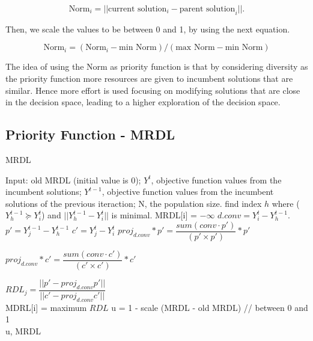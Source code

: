 \begin{equation}
 \text{Norm}_i = ||\text{current solution}_i - \text{parent solution}_i||.
\end{equation}

Then, we scale the values to be between 0 and 1, by using the next equation.

\begin{equation}\label{scaling}
 \text{Norm}_i = (\text{Norm}_i - \text{min  Norm}) / (\text{max Norm} - \text{min Norm})
\end{equation}

The idea of using the Norm as priority function is that by considering diversity as the priority function more resources are given to incumbent solutions that are similar. Hence more effort is used focusing on modifying solutions that are close in the decision space, leading to a higher exploration of the decision space.


\subsection{Priority Function - MRDL} 


\begin{algorithm}[t]
	\caption{MRDL}\label{alg2}
	\begin{algorithmic}[1]
		
		\State Input: old MRDL (initial value is 0); $Y^t$, objective function values from the incumbent solutions; $Y^{t-1}$, objective function values from the incumbent solutions of the previous iteraction; N, the population size.		
		\State find index $h$ where  ($Y^{t-1}_h \succeq Y^t_i$) and $||Y^{t-1}_h - Y^t_i  ||$ is minimal.
		\State MRDL[i] = $-\infty$
		\Else
		\State $d.conv = Y^t_i - Y^{t-1}_h$.
		\State $p \prime = Y^{t-1}_j - Y^{t-1}_h$
		\State $c \prime = Y^t_j - Y^t_i$
		\State $proj_{d.conv}*p \prime = \dfrac{sum(conv \cdot p \prime)}{(p \prime \times p \prime)}*p \prime$
		
		\State $ proj_{d.conv}*c \prime = \dfrac{sum(conv \cdot c \prime)}{(c \prime \times c \prime)}*c \prime$
		
		\State $RDL_j = \dfrac{ ||p \prime - proj_{d.conv}p \prime|| }{||c \prime - proj_{d.conv}c \prime||}$\\
		
		\EndFor
		MDRL[i] = maximum $RDL$
		\EndIf
		\EndFor
		\State u = 1 - scale (MRDL - old MRDL) // between 0 and 1\\
	\Return u, MRDL
	\end{algorithmic}
\end{algorithm}


